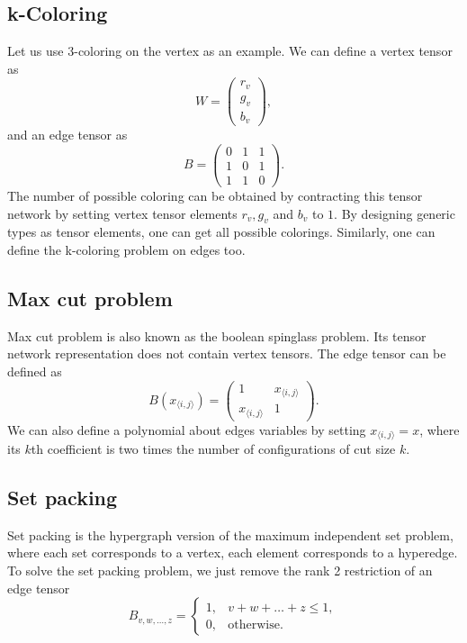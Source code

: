 \documentclass[onefignum, onetabnum]{siamart190516}
\newcommand{\<}{\langle}
\renewcommand{\>}{\rangle}
\newcounter{example}
\begin{document}
\subsection{k-Coloring}
Let us use 3-coloring on the vertex as an example. We can define a vertex tensor as
\begin{equation}
    W = \left(\begin{matrix}
        r_v\\
        g_v\\
        b_v
    \end{matrix}\right),
\end{equation}
and an edge tensor as
\begin{equation}
    B = \left(\begin{matrix}
        0 & 1 & 1\\
        1 & 0 & 1\\
        1 & 1 & 0
    \end{matrix}\right).
\end{equation}
The number of possible coloring can be obtained by contracting this tensor network by setting vertex tensor elements $r_v, g_v$ and $b_v$ to $1$.
By designing generic types as tensor elements, one can get all possible colorings.
Similarly, one can define the k-coloring problem on edges too.

\subsection{Max cut problem}
Max cut problem is also known as the boolean spinglass problem.
Its tensor network representation does not contain vertex tensors.
The edge tensor can be defined as
\begin{equation}
    B(x_{\langle i, j\rangle}) = \left(\begin{matrix}
        1 & x_{\langle i, j\rangle}\\
        x_{\langle i, j\rangle} & 1
    \end{matrix}\right).
\end{equation}
We can also define a polynomial about edges variables by setting $x_{\langle i, j\rangle} = x$,
where its $k$th coefficient is two times the number of configurations of cut size $k$.

\subsection{Set packing}
Set packing is the hypergraph version of the maximum independent set problem, where each set corresponds to a vertex, each element corresponds to a hyperedge.
To solve the set packing problem, we just remove the rank 2 restriction of an edge tensor
\begin{equation}
    B_{v,w,\ldots, z} = \begin{cases}
        1, & v+w+\ldots+z\leq 1,\\
        0, & \text{otherwise}.
    \end{cases}
\end{equation}
\end{document}
